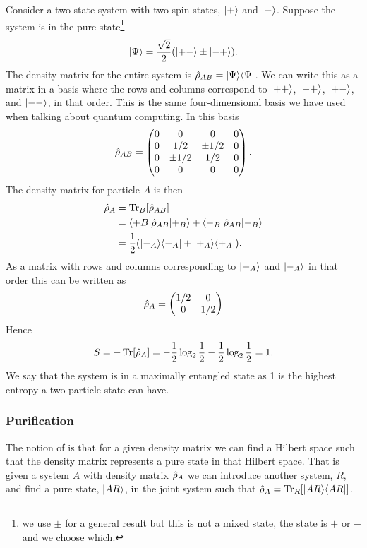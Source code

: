     \begin{example}
        Consider a two state system with two spin states, \(\vert {+} \rangle\) and \(\vert {-} \rangle\).
        Suppose the system is in the pure state\footnote{we use \(\pm\) for a general result but this is not a mixed state, the state is \(+\) or \(-\) and we choose which.}
        \[\vert {\Psi} \rangle = \frac{\sqrt{2}}{2} (\vert {+-} \rangle \pm \vert {-+} \rangle).\]
        The density matrix for the entire system is \(\hat{\rho}_{AB} = \vert {\Psi}\rangle\langle {\Psi} \vert\).
        We can write this as a matrix in a basis where the rows and columns correspond to \(\vert {++} \rangle\), \(\vert {-+} \rangle\), \(\vert {+-} \rangle\), and \(\vert {--} \rangle\), in that order.
        This is the same four-dimensional basis we have used when talking about quantum computing.
        In this basis
        \[
            \hat{\rho}_{AB} =
            \begin{pmatrix}
                0 & 0 & 0 & 0 \\
                0 & 1/2 & \pm 1/2 & 0\\
                0 & \pm 1/2 & 1/2 & 0\\
                0 & 0 & 0 & 0
            \end{pmatrix}
            .
        \]
        The density matrix for particle \(A\) is then
        \begin{align*}
            \hat{\rho}_A &= \Tr_B[\hat{\rho}_{AB}]\\
            &= \langle {+B} \vert\hat{\rho}_{AB}\vert {+_B} \rangle + \langle {-_B} \vert\hat{\rho}_{AB}\vert {-_B} \rangle\\
            &= \frac{1}{2}(\vert {-_A}\rangle\langle {-_A} \vert + \vert {+_A}\rangle\langle {+_A} \vert).
        \end{align*}
        As a matrix with rows and columns corresponding to \(\vert {+_A} \rangle\) and \(\vert {-_A} \rangle\) in that order this can be written as
        \[
            \hat{\rho}_A = 
            \begin{pmatrix}
                1/2 & 0\\
                0 & 1/2
            \end{pmatrix}
        \]
        Hence
        \[S = -\Tr[\hat{\rho}_A] = -\frac{1}{2}\log_2\frac{1}{2} - \frac{1}{2}\log_2\frac{1}{2} = 1.\]
        We say that the system is in a maximally entangled state as 1 is the highest entropy a two particle state can have.
    \end{example}
    
    \subsubsection{Purification}
    The notion of  is that for a given density matrix we can find a Hilbert space such that the density matrix represents a pure state in that Hilbert space.
    That is given a system \(A\) with density matrix \(\hat{\rho}_A\) we can introduce another system, \(R\), and find a pure state, \(\vert {AR} \rangle\), in the joint system such that \(\hat{\rho}_A = \Tr_R[\vert {AR}\rangle\langle {AR} \vert]\).
    
